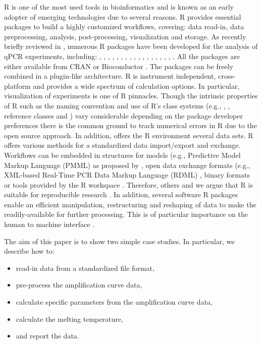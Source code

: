 R is one of the most used tools in 
bioinformatics and is known as an early adopter of emerging technologies 
\citep{pabinger_2014} due to several reasons. R provides essential packages to 
build a highly customized workflows, covering: data read-in, data 
preprocessing, 
analysis, post-processing, visualization and storage. As recently briefly 
reviewed in \citet{pabinger_2014}, numerous R packages have been developed for 
the analysis of qPCR experiments, including: , 
, , , , 
, , , , 
, , , , 
, , , , 
. All the packages are either available from CRAN or 
Bioconductor \citep{gentleman_2004}. The packages can be freely combined in a 
plugin-like architecture. R is instrument independent, cross-platform and 
provides a wide spectrum of calculation options. In particular, visualization 
of 
experiments is one of R pinnacles. Though the intrinsic properties of R such as 
the naming convention \citep{Baaaath_2012} and use of R's class systems (e.g., 
, , reference classes and ) vary considerable 
depending on the package developer preferences there is the common ground to 
track numerical errors in R due to the open source approach. In addition, 
offers 
the R environment several data sets. R offers various methods for a 
standardized 
data import/export and exchange. Workflows can be embedded in structures for 
models (e.g., Predictive Model Markup Language (PMML) as proposed by 
\citet{Guazzelli_2009}, open data exchange formats (e.g., XML-based Real-Time 
PCR Data Markup Language (RDML) \citep{lefever_2009}, binary formats 
\citep{michna_2013} or tools provided by the R workspace \citep{RDCT2010c}. 
Therefore, others and we argue that R is suitable for reproducible research 
\citep{Gesmann_2011, Murrell_2012, gandrud_2013, hofmann_2013, Leeper_2014, 
liu_2014}. In addition, several software R packages enable an efficient 
manipulation, restructuring and reshaping of data to make the readily-available 
for further processing. This is of particular importance on the human to 
machine 
interface \citep{Oh_2014}.

The aim of this paper is to show two simple case studies. In 
particular, we describe how to:
\begin{itemize}
 \item read-in data from a standardized file format,
 \item pre-process the amplification curve data,
 \item calculate specific parameters from the amplification curve data,
 \item calculate the melting temperature,
 \item and report the data.
\end{itemize}

